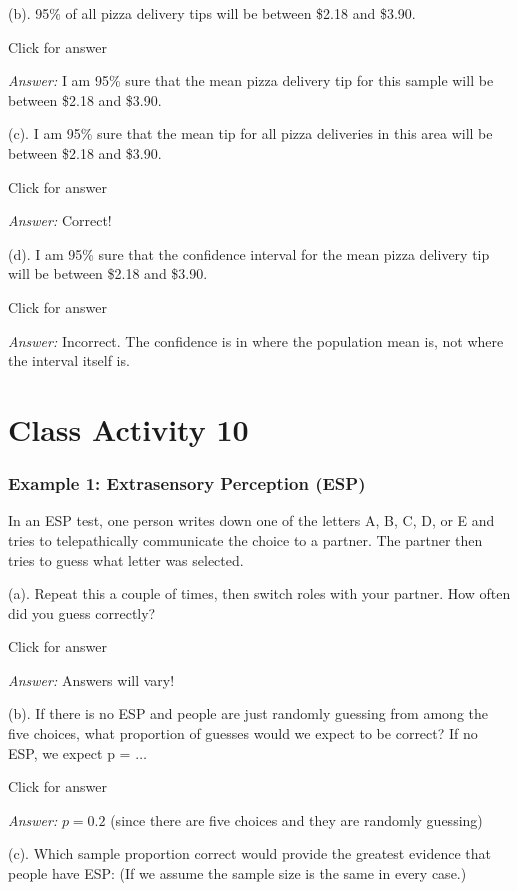 \documentclass[
]{book}
\begin{document}
(b). 95\% of all pizza delivery tips will be between \$2.18 and \$3.90.

Click for answer

\emph{Answer:} I am 95\% sure that the mean pizza delivery tip for this sample will be between \$2.18 and \$3.90.

(c). I am 95\% sure that the mean tip for all pizza deliveries in this area will be between \$2.18 and \$3.90.

Click for answer

\emph{Answer:} Correct!

(d). I am 95\% sure that the confidence interval for the mean pizza delivery tip will be between \$2.18 and \$3.90.

Click for answer

\emph{Answer:} Incorrect. The confidence is in where the population mean is, not where the interval itself is.

\hypertarget{class-activity-10}{%
\chapter{Class Activity 10}\label{class-activity-10}}

\hypertarget{example-1-extrasensory-perception-esp}{%
\subsection{Example 1: Extrasensory Perception (ESP)}\label{example-1-extrasensory-perception-esp}}

In an ESP test, one person writes down one of the letters A, B, C, D, or E and tries to telepathically communicate the choice to a partner. The partner then tries to guess what letter was selected.

(a). Repeat this a couple of times, then switch roles with your partner. How often did you guess correctly?

Click for answer

\emph{Answer:} Answers will vary!

(b). If there is no ESP and people are just randomly guessing from among the five choices, what proportion of guesses would we expect to be correct? If no ESP, we expect p = \(\ldots\)

Click for answer

\emph{Answer:} \(p = 0.2\) (since there are five choices and they are randomly guessing)

(c). Which sample proportion correct would provide the greatest evidence that people have ESP: (If we assume the sample size is the same in every case.)
\end{document}
